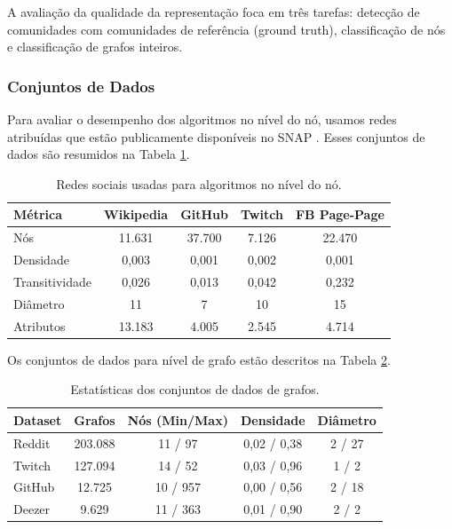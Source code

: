\documentclass[sigconf]{acmart}
\begin{document}
A avaliação da qualidade da representação foca em três tarefas: detecção de comunidades com comunidades de referência (ground truth), classificação de nós e classificação de grafos inteiros.

\subsubsection{Conjuntos de Dados}

Para avaliar o desempenho dos algoritmos no nível do nó, usamos redes atribuídas que estão publicamente disponíveis no SNAP \cite{SNAP}. Esses conjuntos de dados são resumidos na Tabela \ref{tab:datasets_node}.

\begin{table}[h]
\centering
\caption{Redes sociais usadas para algoritmos no nível do nó.}
\label{tab:datasets_node}
\begin{tabular}{lcccc}
\toprule
Métrica & Wikipedia & GitHub & Twitch & FB Page-Page \\
\midrule
Nós & 11.631 & 37.700 & 7.126 & 22.470 \\
Densidade & 0,003 & 0,001 & 0,002 & 0,001 \\
Transitividade & 0,026 & 0,013 & 0,042 & 0,232 \\
Diâmetro & 11 & 7 & 10 & 15 \\
Atributos & 13.183 & 4.005 & 2.545 & 4.714 \\
\bottomrule
\end{tabular}
\end{table}

Os conjuntos de dados para nível de grafo estão descritos na Tabela \ref{tab:datasets_graph}.

\begin{table}[h]
\centering
\caption{Estatísticas dos conjuntos de dados de grafos.}
\label{tab:datasets_graph}
\begin{tabular}{lcccc}
\toprule
Dataset & Grafos & Nós (Min/Max) & Densidade & Diâmetro \\
\midrule
Reddit & 203.088 & 11 / 97 & 0,02 / 0,38 & 2 / 27 \\
Twitch & 127.094 & 14 / 52 & 0,03 / 0,96 & 1 / 2 \\
GitHub & 12.725 & 10 / 957 & 0,00 / 0,56 & 2 / 18 \\
Deezer & 9.629 & 11 / 363 & 0,01 / 0,90 & 2 / 2 \\
\bottomrule
\end{tabular}
\end{table}
\end{document}
